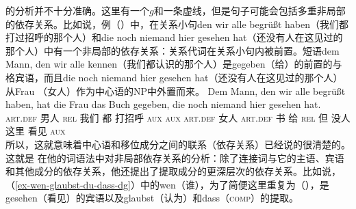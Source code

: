  \citet{GO2009a}的分析并不十分准确。这里有一个$g$和一条虚线，但是句子可能会包括多重非局部的依存关系。比如说，例（）中，在关系小句den wir alle begrüßt haben（我们都打过招呼的那个人）和die noch niemand hier
  gesehen hat（还没有人在这见过的那个人）中有一个非局部的依存关系：关系代词在关系小句内被前置。短语dem Mann, den wir alle kennen（我们都认识的那个人）是gegeben（给）的前置的与格宾语，而且die noch niemand hier gesehen
  hat（还没有人在这见过的那个人）从Frau （女人）作为中心语的NP中外置而来。
\ea
\gll Dem Mann, den wir alle begrüßt haben, hat die Frau das Buch gegeben, die noch niemand hier gesehen hat.\\
     \textsc{art}.\textsc{def} 男人  \textsc{rel} 我们 都 打招呼 \textsc{aux}      \textsc{aux} \textsc{art}.\textsc{def} 女人 \textsc{art}.\textsc{def} 书 给 \textsc{rel} 但 没人 这里 看见 \textsc{aux}\\
\z
所以，这就意味着中心语和移位成分之间的联系（依存关系）已经说的很清楚的。这就是 \citet{Hudson97a,Hudson2000a}在他的词语法中对非局部依存关系的分析：除了连接词与它的主语、宾语和其他成分的依存关系，他还提出了提取成分的更深层次的依存关系。比如说，（\ref{ex-wen-glaubst-du-dass-dg}）中的wen（谁），为了简便这里重复为（），是gesehen（看见）的宾语以及glaubst（认为）和dass（\textsc{comp}）的提取。
